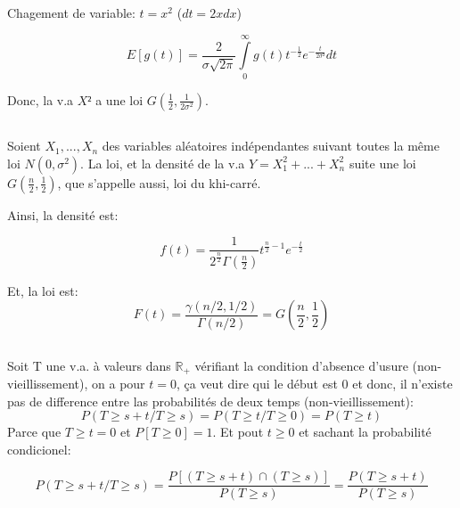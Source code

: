 \documentclass[a4paper]{article}
\begin{document}
Chagement de variable: $t=x^2$ ($dt=2xdx$)

\begin{equation}
E[g(t)]=\frac{2}{\sigma\sqrt{2\pi}}\int\limits_{0}^\infty g(t)t^{-\frac{1}{2}}e^{-\frac{t}{2\sigma²}}dt
\end{equation}

Donc, la v.a $X²$ a une loi $G(\frac{1}{2},\frac{1}{2\sigma^2})$.

\subsection{}
Soient $X_1,...,X_n$  des variables  aléatoires indépendantes suivant  toutes la
même loi  $N(0, \sigma^2)$.  La loi,  et la densité  de la  v.a $Y=X_1^2  +... +
X_n^2$ suite une loi $G(\frac{n}{2},\frac{1}{2})$, que s'appelle aussi, loi du khi-carré.

Ainsi, la densité est:

\begin{equation}
f(t)=\frac{1}{2^{\frac{n}{2}}\Gamma(\frac{n}{2})}t^{\frac{n}{2}-1}e^{-\frac{t}{2}}
\end{equation}

Et, la loi est:
\begin{equation}
F(t)=\frac{\gamma(n/2,1/2)}{\Gamma(n/2)}=G(\frac{n}{2},\frac{1}{2}) 
\end{equation}



\subsection{}
\subsubsection{}
Soit T une  v.a. à valeurs dans $\mathbb{R}_+$  vérifiant la condition d'absence
d'usure (non-vieillissement), on  a pour $t=0$, ça veut dire qui  le début est 0
et donc, il n'existe pas de difference entre las probabilités de deux temps (non-vieillissement):
\begin{equation}
P(T\geq s+t/ T \geq s)=P(T\geq t /T\geq 0)=P(T\geq t )
\end{equation}
Parce  que $T\geq  t=0$  et $P[T\geq  0]=1$. Et  pout  $t\geq 0$  et sachant  la
probabilité condicionel:

\begin{equation}
P(T\geq s+t/ T\geq s)=\frac{P[(T\geq s+t )\cap (T \geq s)]}{P(T\geq s )}=\frac{P(T\geq s+t )}{P(T\geq s )}
\end{equation}
\end{document}
